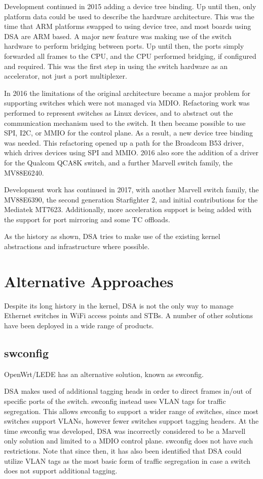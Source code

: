 \documentclass[letterpaper]{article}
\begin{document}
Development continued in 2015 adding a device tree binding. Up until
then, only platform data could be used to describe the hardware
architecture. This was the time that ARM platforms swapped to using
device tree, and most boards using DSA are ARM based. A major new
feature was making use of the switch hardware to perform bridging
between ports. Up until then, the ports simply forwarded all frames to
the CPU, and the CPU performed bridging, if configured and
required. This was the first step in using the switch hardware as an
accelerator, not just a port multiplexer.

In 2016 the limitations of the original architecture became a major
problem for supporting switches which were not managed via
MDIO. Refactoring work was performed to represent switches as Linux
devices, and to abstract out the communication mechanism used to the
switch. It then became possible to use SPI, I2C, or MMIO for the
control plane. As a result, a new device tree binding was needed. This
refactoring opened up a path for the Broadcom B53 driver, which drives
devices using SPI and MMIO. 2016 also sore the addition of a driver
for the Qualcom QCA8K switch, and a further Marvell switch family, the
MV88E6240.

Development work has continued in 2017, with another Marvell switch
family, the MV88E6390, the second generation Starfighter 2, and
initial contributions for the Mediatek MT7623. Additionally, more
acceleration support is being added with the support for port
mirroring and some TC offloads.

As the history as shown, DSA tries to make use of the existing kernel
abstractions and infrastructure where possible.

\section{Alternative Approaches}

Despite its long history in the kernel, DSA is not the only way to
manage Ethernet switches in WiFi access points and STBs. A number of
other solutions have been deployed in a wide range of products.

\subsection{swconfig}

OpenWrt/LEDE has an alternative solution, known as swconfig.

DSA makes used of additional tagging heads in order to direct frames
in/out of specific ports of the switch. swconfig instead uses VLAN
tags for traffic segregation. This allows swconfig to support a wider
range of switches, since most switches support VLANs, however fewer
switches support tagging headers. At the time swconfig was developed,
DSA was incorrectly considered to be a Marvell only solution and
limited to a MDIO control plane. swconfig does not have such
restrictions. Note that since then, it has also been identified that
DSA could utilize VLAN tags as the most basic form of traffic
segregation in case a switch does not support additional tagging.
\end{document}
